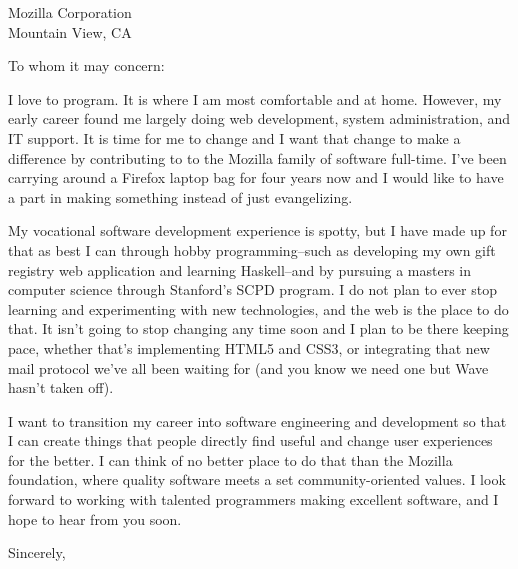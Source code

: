 \documentclass{letter}[11pt]
\begin{document}
\begin{letter}{Mozilla Corporation\\
Mountain View, CA
}

\opening{To whom it may concern:}

I love to program.  It is where I am most comfortable and at home.  However, my early career found me largely doing web development, system administration, and IT support.  It is time for me to change and I want that change to make a difference by contributing to to the Mozilla family of software full-time.  I've been carrying around a Firefox laptop bag for four years now and I would like to have a part in making something instead of just evangelizing.

My vocational software development experience is spotty, but I have made up for that as best I can through hobby programming--such as developing my own gift registry web application and learning Haskell--and by pursuing a masters in computer science through Stanford's SCPD program.  I do not plan to ever stop learning and experimenting with new technologies, and the web is the place to do that.  It isn't going to stop changing any time soon and I plan to be there keeping pace, whether that's implementing HTML5 and CSS3, or integrating that new mail protocol we've all been waiting for (and you know we need one but Wave hasn't taken off).  

I want to transition my career into software engineering and development so that I can create things that people directly find useful and change user experiences for the better.  I can think of no better place to do that than the Mozilla foundation, where quality software meets a set community-oriented values.  I look forward to working with talented programmers making excellent software, and I hope to hear from you soon.

\closing{Sincerely,}
\end{letter}
\end{document}
